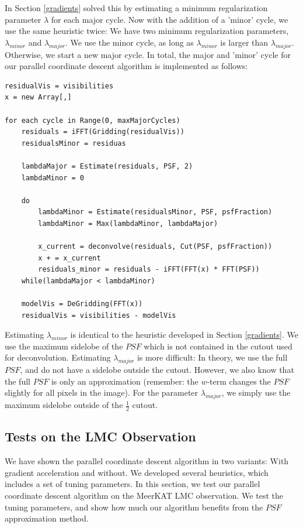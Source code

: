 In Section \ref{gradients} solved this by estimating a minimum regularization parameter $\lambda$ for each major cycle. Now with the addition of a 'minor' cycle, we use the same heuristic twice: We have two minimum regularization parameters, $\lambda_{minor}$ and $\lambda_{major}$. We use the minor cycle, as long as  $\lambda_{minor}$ is larger than  $\lambda_{major}$. Otherwise, we start a new major cycle. In total, the major and 'minor' cycle for our parallel coordinate descent algorithm is implemented as follows:

\begin{lstlisting}
residualVis = visibilities
x = new Array[,]

for each cycle in Range(0, maxMajorCycles)
	residuals = iFFT(Gridding(residualVis))
	residualsMinor = residuas
	
	lambdaMajor = Estimate(residuals, PSF, 2)
	lambdaMinor = 0
	
	do
		lambdaMinor = Estimate(residualsMinor, PSF, psfFraction)
		lambdaMinor = Max(lambdaMinor, lambdaMajor)
		
		x_current = deconvolve(residuals, Cut(PSF, psfFraction))
		x + = x_current
		residuals_minor = residuals - iFFT(FFT(x) * FFT(PSF))
	while(lambdaMajor < lambdaMinor)
	
	modelVis = DeGridding(FFT(x))
	residualVis = visibilities - modelVis
\end{lstlisting}

Estimating $\lambda_{minor}$ is identical to the heuristic developed in Section \ref{gradients}. We use the maximum sidelobe of the $PSF$ which is not contained in the cutout used for deconvolution. Estimating $\lambda_{major}$ is more difficult: In theory, we use the full $PSF$, and do not have a sidelobe outside the cutout. However, we also know that the full $PSF$ is only an approximation (remember: the $w$-term changes the $PSF$ slightly for all pixels in the image). For the parameter $\lambda_{major}$, we simply use the maximum sidelobe outside of the $\frac{1}{2}$ cutout.


\subsection{Tests on the LMC Observation}\label{pcdm:results}
We have shown the parallel coordinate descent algorithm in two variants: With gradient acceleration and without. We developed several heuristics, which includes a set of tuning parameters. In this section, we test our parallel coordinate descent algorithm on the MeerKAT LMC observation. We test the tuning parameters, and show how much our algorithm benefits from the $PSF$ approximation method.


